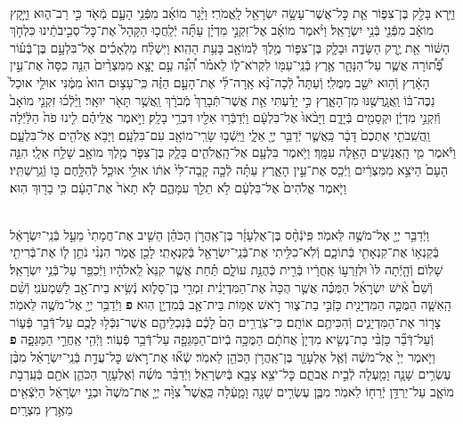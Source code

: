 \documentclass[twoside, openany, parskip=half, 11pt]{book}
\begin{document}
\begin{footnotesize}
\begin{multicols}{2}
\\
וַיַּ֥רְא בָּלָ֖ק בֶּן־צִפּ֑וֹר אֵ֛ת כׇּל־אֲשֶׁר־עָשָׂ֥ה יִשְׂרָאֵ֖ל לָֽאֱמֹרִֽי׃ וַיָּ֨גָר מוֹאָ֜ב מִפְּֿנֵ֥י הָעָ֛ם מְֿאֹ֖ד כִּ֣י רַב־ה֑וּא וַיָּ֣קָץ מוֹאָ֔ב מִפְּֿנֵ֖י בְּֿנֵ֥י יִשְׂרָאֵֽל׃ וַיֹּ֨אמֶר מוֹאָ֜ב אֶל־זִקְנֵ֣י מִדְיָ֗ן עַתָּ֞ה יְֿלַֽחֲכ֤וּ הַקָּהָל֙ אֶת־כׇּל־סְבִ֣יבֹתֵ֔ינוּ כִּלְחֹ֣ךְ הַשּׁ֔וֹר אֵ֖ת יֶ֣רֶק הַשָּׂדֶ֑ה וּבָלָ֧ק בֶּן־צִפּ֛וֹר מֶ֥לֶךְ לְֿמוֹאָ֖ב בָּעֵ֥ת הַהִֽוא׃  וַיִּשְׁלַ֨ח מַלְאָכִ֜ים אֶל־בִּלְעָ֣ם בֶּן־בְּֿע֗וֹר פְּֿ֠ת֠וֹרָה אֲשֶׁ֧ר עַל־הַנָּהָ֛ר אֶ֥רֶץ בְּֿנֵֽי־עַמּ֖וֹ לִקְרֹא־ל֑וֹ לֵאמֹ֗ר הִ֠נֵּ֠ה עַ֣ם יָצָ֤א מִמִּצְרַ֨יִם֙ הִנֵּ֤ה כִסָּה֙ אֶת־עֵ֣ין הָאָ֔רֶץ וְֿה֥וּא יֹשֵׁ֖ב מִמֻּלִֽי׃ וְֿעַתָּה֩ לְֿכָה־נָּ֨א אָֽרָה־לִּ֜י אֶת־הָעָ֣ם הַזֶּ֗ה כִּֽי־עָצ֥וּם הוּא֙ מִמֶּ֔נִּי אוּלַ֤י אוּכַל֙ נַכֶּה־בּ֔וֹ וַֽאֲגָֽרֲשֶׁ֖נּוּ מִן־הָאָ֑רֶץ כִּ֣י יָדַ֗עְתִּי אֵ֤ת אֲשֶׁר־תְּֿבָרֵךְ֙ מְֿבֹרָ֔ךְ וַֽאֲשֶׁ֥ר תָּאֹ֖ר יוּאָֽר׃ וַיֵּ֨לְֿכ֜וּ זִקְנֵ֤י מוֹאָב֙ וְֿזִקְנֵ֣י מִדְיָ֔ן וּקְסָמִ֖ים בְּֿיָדָ֑ם וַיָּבֹ֨אוּ֙ אֶל־בִּלְעָ֔ם וַיְֿדַבְּֿר֥וּ אֵלָ֖יו דִּבְרֵ֥י בָלָֽק׃  וַיֹּ֣אמֶר אֲלֵיהֶ֗ם לִ֤ינוּ פֹה֙ הַלַּ֔יְֿלָה וַֽהֲשִֽׁבֹתִ֤י אֶתְכֶם֙ דָּבָ֔ר כַּֽאֲשֶׁ֛ר יְֿדַבֵּ֥ר יְיָ֖ אֵלָ֑י וַיֵּֽשְֿׁב֥וּ שָׂרֵֽי־מוֹאָ֖ב עִם־בִּלְעָֽם׃ וַיָּבֹ֥א אֱלֹהִ֖ים אֶל־בִּלְעָ֑ם וַיֹּ֕אמֶר מִ֛י הָֽאֲנָשִׁ֥ים הָאֵ֖לֶּה עִמָּֽךְ׃ וַיֹּ֥אמֶר בִּלְעָ֖ם אֶל־הָֽאֱלֹהִ֑ים בָּלָ֧ק בֶּן־צִפֹּ֛ר מֶ֥לֶךְ מוֹאָ֖ב שָׁלַ֥ח אֵלָֽי׃ הִנֵּ֤ה הָעָם֙ הַיֹּצֵ֣א מִמִּצְרַ֔יִם וַיְֿכַ֖ס אֶת־עֵ֣ין הָאָ֑רֶץ עַתָּ֗ה לְֿכָ֤ה קָֽבָה־לִּי֙ אֹת֔וֹ אוּלַ֥י אוּכַ֛ל לְֿהִלָּ֥חֶם בּ֖וֹ וְֿגֵֽרַשְׁתִּֽיו׃ וַיֹּ֤אמֶר אֱלֹהִים֙ אֶל־בִּלְעָ֔ם לֹ֥א תֵלֵ֖ךְ עִמָּהֶ֑ם לֹ֤א תָאֹר֙ אֶת־הָעָ֔ם כִּ֥י בָר֖וּךְ הֽוּא׃

\\
וַיְֿדַבֵּ֥ר יְיָ֖ אֶל־מֹשֶׁ֥ה לֵּאמֹֽר׃ פִּֽיֹנְֿחָ֨ס בֶּן־אֶלְעָזָ֜ר בֶּן־אַֽהֲרֹ֣ן הַכֹּהֵ֗ן הֵשִׁ֤יב אֶת־חֲמָתִי֙ מֵעַ֣ל בְּֿנֵֽי־יִשְׂרָאֵ֔ל בְּֿקַנְא֥וֹ אֶת־קִנְאָתִ֖י בְּֿתוֹכָ֑ם וְֿלֹֽא־כִלִּ֥יתִי אֶת־בְּֿנֵֽי־יִשְׂרָאֵ֖ל בְּֿקִנְאָתִֽי׃ לָכֵ֖ן אֱמֹ֑ר הִנְנִ֨י נֹתֵ֥ן ל֛וֹ אֶת־בְּֿרִיתִ֖י שָׁלֽוֹֹם׃  וְֿהָ֤יְֿתָה לּוֹ֙ וּלְזַרְע֣וֹ אַֽחֲרָ֔יו בְּֿרִ֖ית כְּֿהֻנַּ֣ת עוֹלָ֑ם תַּ֗חַת אֲשֶׁ֤ר קִנֵּא֙ לֵֽאלֹהָ֔יו וַיְֿכַפֵּ֖ר עַל־בְּֿנֵ֥י יִשְׂרָאֵֽל׃ וְֿשֵׁם֩ אִ֨ישׁ יִשְׂרָאֵ֜ל הַמֻּכֶּ֗ה אֲשֶׁ֤ר הֻכָּה֙ אֶת־הַמִּדְיָנִ֔ית זִמְרִ֖י בֶּן־סָל֑וּא נְֿשִׂ֥יא בֵית־אָ֖ב לַשִּׁמְעֹנִֽי׃ וְֿשֵׁ֨ם הָֽאִשָּׁ֧ה הַמֻּכָּ֛ה הַמִּדְיָנִ֖ית כָּזְֿבִּ֣י בַת־צ֑וּר רֹ֣אשׁ אֻמּ֥וֹת בֵּית־אָ֛ב בְּֿמִדְיָ֖ן הֽוּא׃ \textbf{פ}
וַיְֿדַבֵּ֥ר יְיָ֖ אֶל־מֹשֶׁ֥ה לֵּאמֹֽר׃ צָר֖וֹר אֶת־הַמִּדְיָנִ֑ים וְֿהִכִּיתֶ֖ם אוֹתָֽם׃ כִּי־צֹֽרֲרִ֥ים הֵם֙ לָכֶ֔ם בְּֿנִכְלֵיהֶ֛ם אֲשֶׁר־נִכְּֿל֥וּ לָכֶ֖ם עַל־דְּֿבַ֣ר פְּֿע֑וֹר וְֿעַל־דְּֿבַ֞ר כָּזְֿבִּ֨י בַת־נְשִׂ֤יא מִדְיָן֙ אֲחֹתָ֔ם הַמֻּכָּ֥ה בְֿיוֹם־הַמַּגֵּפָ֖ה עַל־דְּֿבַ֥ר פְּֿעֽוֹר׃ וַיְֿהִ֖י אַֽחֲרֵ֣י הַמַּגֵּפָ֑ה \textbf{פ}
וַיֹּ֤אמֶר יְיָ֙ אֶל־מֹשֶׁ֔ה וְֿאֶ֧ל אֶלְעָזָ֛ר בֶּן־אַֽהֲרֹ֥ן הַכֹּהֵ֖ן לֵאמֹֽר׃ שְֿׂא֞וּ אֶת־רֹ֣אשׁ כׇּל־עֲדַ֣ת בְּֿנֵֽי־יִשְׂרָאֵ֗ל מִבֶּ֨ן עֶשְׂרִ֥ים שָׁנָ֛ה וָמַ֖עְלָה לְֿבֵ֣ית אֲבֹתָ֑ם כׇּל־יֹצֵ֥א צָבָ֖א בְּֿיִשְׂרָאֵֽל׃ וַיְֿדַבֵּ֨ר מֹשֶׁ֜ה וְֿאֶלְעָזָ֧ר הַכֹּהֵ֛ן אֹתָ֖ם בְּֿעַֽרְבֹ֣ת מוֹאָ֑ב עַל־יַרְדֵּ֥ן יְֿרֵח֖וֹ לֵאמֹֽר׃ מִבֶּ֛ן עֶשְׂרִ֥ים שָׁנָ֖ה וָמָ֑עְֿלָה כַּֽאֲשֶׁר֩ צִוָּ֨ה יְיָ֤ אֶת־מֹשֶׁה֙ וּבְנֵ֣י יִשְׂרָאֵ֔ל הַיֹּֽצְֿאִ֖ים מֵאֶ֥רֶץ מִצְרָֽיִם׃



\end{multicols}
\end{footnotesize}
\end{document}
